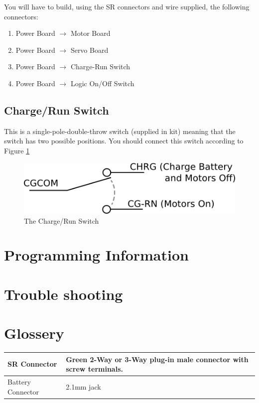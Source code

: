 \documentclass[a4paper, 12pt]{article}
\begin{document}
You will have to build, using the SR connectors and wire supplied, the following connectors:

\begin{enumerate}
\item Power Board  \(\rightarrow\) Motor Board
\item Power Board  \(\rightarrow\) Servo Board
\item Power Board  \(\rightarrow\) Charge-Run Switch
\item Power Board  \(\rightarrow\) Logic On/Off Switch
\end{enumerate}

\subsection{Charge/Run Switch}
This is a single-pole-double-throw switch (supplied in kit) meaning that the switch has two possible positions. You should connect this switch according to Figure \ref{fig:chrgrun} 
\begin{figure}[h!]
\center
\includegraphics[scale=0.5]{chrg-run-switch}
\caption{The Charge/Run Switch}
\label{fig:chrgrun}
\end{figure}

\section{Programming Information}

\section{Trouble shooting}


\section{Glossery}
\begin{tabular}{| l | p{5cm}|}
\hline
SR Connector & Green 2-Way or 3-Way plug-in male connector with screw terminals. \\ \hline
Battery Connector & 2.1mm jack \\
\hline
\end{tabular}
\end{document}
